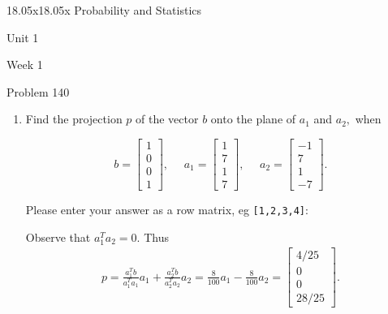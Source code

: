 \begin{edXcourse}{18.05x}{18.05x Probability and Statistics}

\begin{edXchapter}{Unit 1}

\begin{edXsection}{Week 1}


\begin{edXsequential}

\newpage

\begin{edXproblem}{Problem 1}{40}

\begin{enumerate}

\item Find the projection $p$ of the vector $b$ onto the plane of $a_{1}$ and
$a_{2},$ when


\hspace{4em} $$  
b =
  \left [ \begin{array}{c}
1\\
0\\
0\\
1
\end{array} \right ],
\, \, \, \, \, \, \, \,
a_{1} = 
  \left [ \begin{array}{c}
1\\
7\\
1\\
7
\end{array} \right ], 
\, \, \, \, \, \, \, \,
a_{2} =  
  \left [ \begin{array}{r}
-1\\
7\\
1\\
-7
\end{array} \right ] .
$$

Please enter your answer as a row matrix, eg {\tt [1,2,3,4]}:	%



\begin{sol}
Observe that $a_1^T a_2 = 0$. Thus
\begin{eqnarray*}
p = \frac{a_1^T b}{a_1^T a_1} a_1 +  \frac{a_2^T b}{a_2^T a_2} a_2 = \frac{8}{100}a_1 - \frac{8}{100} a_2 = \begin{bmatrix} 4/25 \\ 0 \\ 0 \\ 28/25 \end{bmatrix}.
\end{eqnarray*}
\end{sol}


\end{enumerate}
\end{edXproblem}
\end{edXsequential}
\end{edXsection}
\end{edXchapter}
\end{edXcourse}
